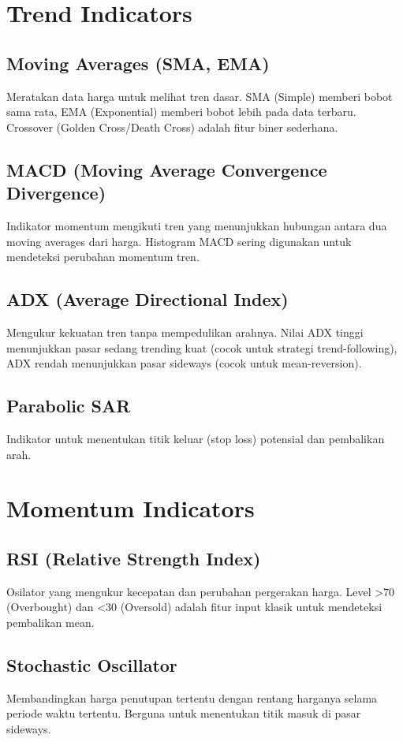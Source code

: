 \documentclass[12pt,a4paper]{book}
\begin{document}
\section{Trend Indicators}
\subsection{Moving Averages (SMA, EMA)}
Meratakan data harga untuk melihat tren dasar. SMA (Simple) memberi bobot sama rata, EMA (Exponential) memberi bobot lebih pada data terbaru. Crossover (Golden Cross/Death Cross) adalah fitur biner sederhana.

\subsection{MACD (Moving Average Convergence Divergence)}
Indikator momentum mengikuti tren yang menunjukkan hubungan antara dua moving averages dari harga. Histogram MACD sering digunakan untuk mendeteksi perubahan momentum tren.

\subsection{ADX (Average Directional Index)}
Mengukur kekuatan tren tanpa mempedulikan arahnya. Nilai ADX tinggi menunjukkan pasar sedang trending kuat (cocok untuk strategi trend-following), ADX rendah menunjukkan pasar sideways (cocok untuk mean-reversion).

\subsection{Parabolic SAR}
Indikator untuk menentukan titik keluar (stop loss) potensial dan pembalikan arah.

\section{Momentum Indicators}
\subsection{RSI (Relative Strength Index)}
Osilator yang mengukur kecepatan dan perubahan pergerakan harga. Level >70 (Overbought) dan <30 (Oversold) adalah fitur input klasik untuk mendeteksi pembalikan mean.

\subsection{Stochastic Oscillator}
Membandingkan harga penutupan tertentu dengan rentang harganya selama periode waktu tertentu. Berguna untuk menentukan titik masuk di pasar sideways.
\end{document}
